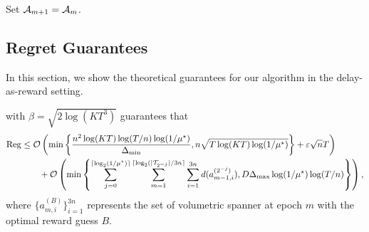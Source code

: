 \begin{algorithm}[H]
{    \nl {}
    
    \nl Set ${\mathcal{A}}_{m+1} = {\mathcal{A}}_m$.
    
    \nl {}
    \nl {}
}
\end{algorithm}

\subsection{Regret Guarantees}\label{app: reward-regret}
In this section, we show the theoretical guarantees for our algorithm in the delay-as-reward setting.

\begin{theorem}\label{thm:reward-main}
     with $\beta = \sqrt{2\log(KT^3)}$ guarantees that
    \begin{align*}
        {\mathrm{Reg}} &\leq \mathcal{O}\left(\min\left\{\frac{n^2\log(KT)\log(T/n)\log(1/\mu^\star)}{\Delta_{\min}}, n\sqrt{T\log(KT)\log(1/\mu^\star)}\right\}+\varepsilon\sqrt{n}T\right)\\
        &\qquad+\mathcal{O}\left(\min\left\{\sum_{j=0}^{\lceil\log_2(1/\mu^\star)\rceil}\sum_{m=1}^{\lceil\log_2(|{\mathcal{T}}_{2^{-j}}|/3n\rceil}\sum_{i=1}^{3n} d(a_{m-1,i}^{(2^{-j})}), D\Delta_{\max}\log(1/\mu^\star)\log(T/n)\right\}\right),
    \end{align*}
    where $\{a_{m,i}^{(B)}\}_{i=1}^{3n}$ represents the set of volumetric spanner at epoch $m$ with the optimal reward guess $B$. 
\end{theorem}

